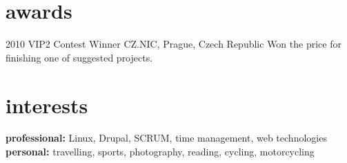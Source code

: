\documentclass[]{friggeri-cv} %
\begin{document}

\section{awards}

\begin{entrylist}
\entry
{2010}
{VIP2 Contest Winner}
{CZ.NIC, Prague, Czech Republic}
{Won the price for finishing one of suggested projects.}
\end{entrylist}


\section{interests}

\textbf{professional:} Linux, Drupal, SCRUM, time management, web technologies \\
\textbf{personal:} travelling, sports, photography, reading, cycling, motorcycling
\end{document}
